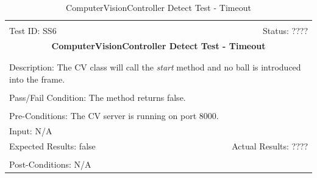 \documentclass[11pt]{article}
\begin{document}
\begin{center}
\begin{table}[H]
\begin{tabular}{|l r|}\hline&\\[-2mm]
	Test ID: SS6	&Status: ????\\[-3mm]
	\multicolumn{2}{|c|}{\textbf{\large{ComputerVisionController Detect Test - Timeout}}}\\&\\\hline&\\[-3mm]
	\multicolumn{2}{|p{\textwidth}|}{Description: The CV class will call the \textit{start} method and no ball is introduced into the frame.}\\[1mm]\hline&\\[-3mm]
	\multicolumn{2}{|p{\textwidth}|}{Pass/Fail Condition: The method returns false.}\\[1mm]\hline&\\[-3mm]
	\multicolumn{2}{|p{\textwidth}|}{Pre-Conditions: The CV server is running on port 8000.}\\[4mm]
	\multicolumn{2}{|p{\textwidth}|}{Input: N/A}\\[2mm]\hline
	\multicolumn{1}{|p{0.49\textwidth}}{Expected Results: false}	&\multicolumn{1}{|p{0.45\textwidth}|}{Actual Results: ????}\\\hline&\\[-3mm]
	\multicolumn{2}{|p{\textwidth}|}{Post-Conditions: N/A}\\\hline
\end{tabular}
\caption{ComputerVisionController Detect Test - Timeout}
\end{table}
\end{center}
\end{document}
